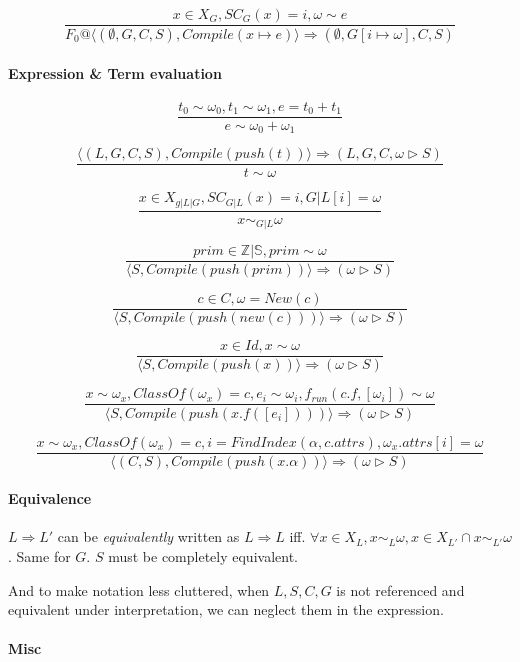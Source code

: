 \documentclass[]{article}
\numberwithin{equation}{section}
\numberwithin{figure}{section}
\numberwithin{table}{section}
\begin{document}
\[\frac{x \in X_G, SC_G(x) = i, \omega \sim e}
        {F_0@\langle (\emptyset, G, C, S), Compile (x \mapsto e) \rangle \Rightarrow (\emptyset, G[i \mapsto \omega], C, S)}\]

\paragraph{Expression \& Term
evaluation}\label{expression-term-evaluation}

\[\frac{t_0 \sim \omega_0, t_1 \sim \omega_1, e = t_0 + t_1}
        {e \sim \omega_0 + \omega_1}\]

\[\frac{\langle(L, G, C, S), Compile(push(t)) \rangle \Rightarrow (L, G, C, \omega \rhd S)}
        {t \sim \omega}\]

\[\frac{x \in X_{g|L|G}, SC_{G|L}(x) = i, G|L[i] = \omega}{x \sim_{G|L} \omega}\]

\[\frac{prim \in \mathbb{Z|S}, prim \sim \omega}
        {\langle S, Compile(push(prim)) \rangle \Rightarrow (\omega \rhd S)}\]

\[\frac{c \in C, \omega = New(c)}
        {\langle S, Compile(push(new(c))) \rangle \Rightarrow (\omega \rhd S)}\]

\[\frac{x \in Id, x \sim \omega}
        {\langle S, Compile(push(x)) \rangle \Rightarrow (\omega \rhd S)}\]

\[\frac{x \sim \omega_x, ClassOf(\omega_x) = c,  e_i \sim \omega_i, f_{run}(c.f, [\omega_i]) \sim \omega}
        {\langle S, Compile(push(x.f([e_i]))) \rangle \Rightarrow (\omega \rhd S)}\]

\[\frac{x \sim \omega_x, ClassOf(\omega_x) = c, i = FindIndex(\alpha, c.attrs), \omega_x.attrs[i] = \omega }
        {\langle (C, S), Compile(push(x.\alpha)) \rangle \Rightarrow (\omega \rhd S)}\]

\paragraph{Equivalence}\label{equivalence}

$L \Rightarrow L'$ can be \emph{equivalently} written as
$L \Rightarrow L$ iff.
$\forall x \in X_{L}, x \sim_L \omega, x \in X_{L'} \cap x \sim_{L'} \omega$.
Same for $G$. $S$ must be completely equivalent.

And to make notation less cluttered, when $L, S, C, G$ is not referenced
and equivalent under interpretation, we can neglect them in the
expression.

\paragraph{Misc}\label{misc}
\end{document}
